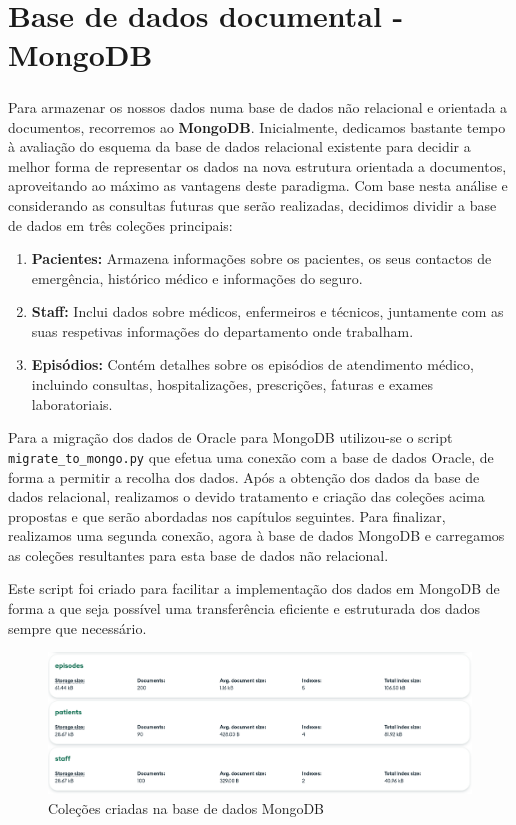 \chapter{Base de dados documental - MongoDB}
\paragraph{}
Para armazenar os nossos dados numa base de dados não relacional e orientada a documentos, recorremos ao \textbf{MongoDB}. Inicialmente, dedicamos bastante tempo à avaliação do esquema da base de dados relacional existente para decidir a melhor forma de representar os dados na nova estrutura orientada a documentos, aproveitando ao máximo as vantagens deste paradigma. Com base nesta análise e considerando as consultas futuras que serão realizadas, decidimos dividir a base de dados em três coleções principais:

\begin{enumerate}
    \item \textbf{Pacientes:} Armazena informações sobre os pacientes, os seus contactos de emergência, histórico médico e informações do seguro.
    \item \textbf{Staff:} Inclui dados sobre médicos, enfermeiros e técnicos, juntamente com as suas respetivas informações do departamento onde trabalham.
    \item \textbf{Episódios:} Contém detalhes sobre os episódios de atendimento médico, incluindo consultas, hospitalizações, prescrições, faturas e exames laboratoriais.
\end{enumerate}

Para a migração dos dados de Oracle para MongoDB utilizou-se o script \texttt{migrate_to_mongo.py} que efetua uma conexão com a base de dados Oracle, de forma a permitir a recolha dos dados. Após a obtenção dos dados da base de dados relacional, realizamos o devido tratamento e criação das coleções acima propostas e que serão abordadas nos capítulos seguintes. Para finalizar, realizamos uma segunda conexão, agora à base de dados MongoDB e carregamos as coleções resultantes para esta base de dados não relacional. 

Este script foi criado para facilitar a implementação dos dados em MongoDB de forma a que seja possível uma transferência eficiente e estruturada dos dados sempre que necessário.

\begin{figure}[H]
    \centering
    \includegraphics[width=0.9\linewidth]{Imagens/MongoDB/colecoes_mongo.png}
    \caption{Coleções criadas na base de dados MongoDB}
    \label{fig:colecoes_mongo}
\end{figure}

